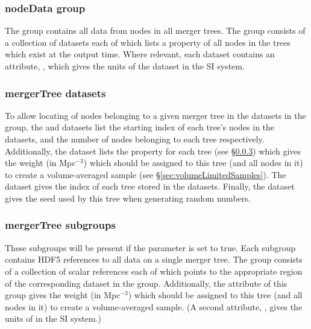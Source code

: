 \subsubsection{nodeData group}\label{sec:nodeDataGroup}

The  group contains all data from nodes in all merger trees. The group consists of a collection of datasets each of which lists a property of all nodes in the trees which exist at the output time. Where relevant, each dataset contains an attribute, , which gives the units of the dataset in the SI system.

\subsubsection{mergerTree datasets}\label{sec:mergerTreeDatasets}

To allow locating of nodes belonging to a given merger tree in the datasets in the  group, the  and  datasets list the starting index of each tree's nodes in the  datasets, and the number of nodes belonging to each tree respectively. Additionally, the  dataset lists the  property for each tree (see \S\ref{sec:mergerTreeSubgroups}) which gives the weight (in Mpc$^{-3}$) which should be assigned to this tree (and all nodes in it) to create a volume-averaged sample (see \S\ref{sec:volumeLimitedSamples}). The  dataset gives the index of each tree stored in the  datasets. Finally, the  dataset gives the seed used by this tree when generating random numbers.

\subsubsection{mergerTree subgroups}\label{sec:mergerTreeSubgroups}

These subgroups will be present if the \mono{[mergerTreeOutputReferences]} parameter is set to true. Each  subgroup contains HDF5 references to all data on a single merger tree. The group consists of a collection of scalar references each of which points to the appropriate region of the corresponding dataset in the  group. Additionally, the  attribute of this group gives the weight (in Mpc$^{-3}$) which should be assigned to this tree (and all nodes in it) to create a volume-averaged sample. (A second attribute, , gives the units of  in the SI system.)

